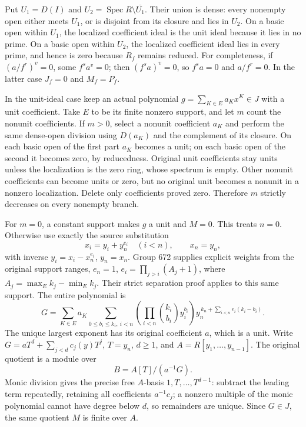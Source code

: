 Put \(U_1=D(I)\) and \(U_2=\operatorname{Spec}R\setminus\overline{U_1}\). Their union is dense: every nonempty open either meets \(U_1\), or is disjoint from its closure and lies in \(U_2\). On a basic open within \(U_1\), the localized coefficient ideal is the unit ideal because it lies in no prime. On a basic open within \(U_2\), the localized coefficient ideal lies in every prime, and hence is zero because \(R_f\) remains reduced. For completeness, if \((a/f^r)^v=0\), some \(f^s a^v=0\); then \((f^s a)^v=0\), so \(f^s a=0\) and \(a/f^r=0\). In the latter case \(J_f=0\) and \(M_f=P_f\).

In the unit-ideal case keep an actual polynomial \(g=\sum_{K\in E}a_Kx^K\in J\) with a unit coefficient. Take \(E\) to be its finite nonzero support, and let \(m\) count the nonunit coefficients. If \(m>0\), select a nonunit coefficient \(a_K\) and perform the same dense-open division using \(D(a_K)\) and the complement of its closure. On each basic open of the first part \(a_K\) becomes a unit; on each basic open of the second it becomes zero, by reducedness. Original unit coefficients stay units unless the localization is the zero ring, whose spectrum is empty. Other nonunit coefficients can become units or zero, but no original unit becomes a nonunit in a nonzero localization. Delete only coefficients proved zero. Therefore \(m\) strictly decreases on every nonempty branch.

For \(m=0\), a constant support makes \(g\) a unit and \(M=0\). This treats \(n=0\). Otherwise use exactly the source substitution \[
 x_i=y_i+y_n^{e_i}\quad(i<n),\qquad x_n=y_n,
\] with inverse \(y_i=x_i-x_n^{e_i}\), \(y_n=x_n\). Group 672 supplies explicit weights from the original support ranges, \(e_n=1\), \(e_i=\prod_{j>i}(A_j+1)\), where \(A_j=\max_E k_j-\min_E k_j\). Their strict separation proof applies to this same support. The entire polynomial is \[
 G=\sum_{K\in E}a_K
 \sum_{0\le b_i\le k_i,\ i<n}
 \left(\prod_{i<n}\binom{k_i}{b_i}y_i^{b_i}\right)
 y_n^{\,k_n+\sum_{i<n}e_i(k_i-b_i)}.
\] The unique largest exponent has its original coefficient \(a\), which is a unit. Write \(G=aT^d+\sum_{j<d}c_j(y)T^j\), \(T=y_n\), \(d\ge1\), and \(A=R[y_1,\ldots,y_{n-1}]\). The original quotient is a module over \[
 B=A[T]/(a^{-1}G).
\] Monic division gives the precise free \(A\)-basis \(1,T,\ldots,T^{d-1}\): subtract the leading term repeatedly, retaining all coefficients \(a^{-1}c_j\); a nonzero multiple of the monic polynomial cannot have degree below \(d\), so remainders are unique. Since \(G\in J\), the same quotient \(M\) is finite over \(A\).

